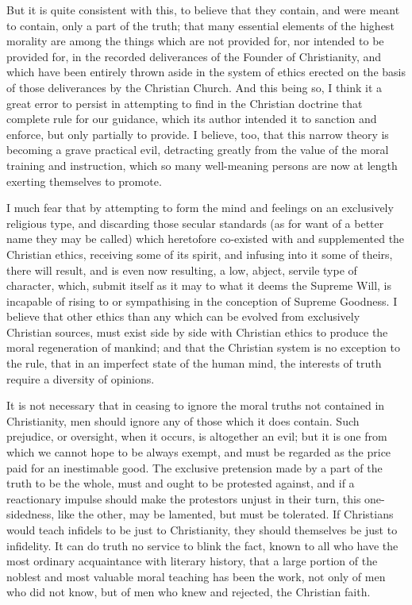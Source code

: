 But it is quite consistent with this, to believe that they contain, and were meant to contain, only a part of the truth; that many essential elements of the highest morality are among the things which are not provided for, nor intended to be provided for, in the recorded deliverances of the Founder of Christianity, and which have been entirely thrown aside in the system of ethics erected on the basis of those deliverances by the Christian Church. And this being so, I think it a great error to persist in attempting to find in the Christian doctrine that complete rule for our guidance, which its author intended it to sanction and enforce, but only partially to provide. I believe, too, that this narrow theory is becoming a grave practical evil, detracting greatly from the value of the moral training and instruction, which so many well-meaning persons are now at length exerting themselves to promote.\par

I much fear that by attempting to form the mind and feelings on an exclusively religious type, and discarding those secular standards (as for want of a better name they may be called) which heretofore co-existed with and supplemented the Christian ethics, receiving some of its spirit, and infusing into it some of theirs, there will result, and is even now resulting, a low, abject, servile type of character, which, submit itself as it may to what it deems the Supreme Will, is incapable of rising to or sympathising in the conception of Supreme Goodness. I believe that other ethics than any which can be evolved from exclusively Christian sources, must exist side by side with Christian ethics to produce the moral regeneration of mankind; and that the Christian system is no exception to the rule, that in an imperfect state of the human mind, the interests of truth require a diversity of opinions.\par

It is not necessary that in ceasing to ignore the moral truths not contained in Christianity, men should ignore any of those which it does contain. Such prejudice, or oversight, when it occurs, is altogether an evil; but it is one from which we cannot hope to be always exempt, and must be regarded as the price paid for an inestimable good. The exclusive pretension made by a part of the truth to be the whole, must and ought to be protested against, and if a reactionary impulse should make the protestors unjust in their turn, this one-sidedness, like the other, may be lamented, but must be tolerated. If Christians would teach infidels to be just to Christianity, they should themselves be just to infidelity. It can do truth no service to blink the fact, known to all who have the most ordinary acquaintance with literary history, that a large portion of the noblest and most valuable moral teaching has been the work, not only of men who did not know, but of men who knew and rejected, the Christian faith.\par

